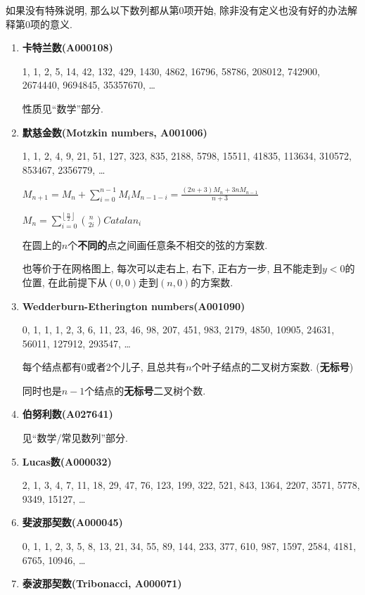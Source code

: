 如果没有特殊说明, 那么以下数列都从第$0$项开始, 除非没有定义也没有好的办法解释第$0$项的意义.

\begin{enumerate}

\item \textbf{卡特兰数(A000108)}

1, 1, 2, 5, 14, 42, 132, 429, 1430, 4862, 16796, 58786, 208012, 742900, 2674440, 9694845, 35357670, \dots

性质见``数学''部分.

\item \textbf{默慈金数(Motzkin numbers, A001006)}

1, 1, 2, 4, 9, 21, 51, 127, 323, 835, 2188, 5798, 15511, 41835, 113634, 310572, 853467, 2356779, \dots

$ M_{n + 1} = M_n + \sum_{i = 0} ^ {n - 1} M_i M_{n - 1 - i} = \frac {(2n + 3)M_n + 3n M_{n - 1}} {n + 3} $

$ M_n = \sum_{i = 0} ^ {\left\lfloor \frac n 2 \right\rfloor} {n \choose 2i} Catalan_{i} $

在圆上的$n$个\textbf{不同的}点之间画任意条不相交的弦的方案数.

也等价于在网格图上, 每次可以走右上, 右下, 正右方一步, 且不能走到$y<0$的位置, 在此前提下从$(0, 0)$走到$(n, 0)$的方案数.


\item \textbf{Wedderburn-Etherington numbers(A001090)}

0, 1, 1, 1, 2, 3, 6, 11, 23, 46, 98, 207, 451, 983, 2179, 4850, 10905, 24631, 56011, 127912, 293547, \dots

每个结点都有$0$或者$2$个儿子, 且总共有$n$个叶子结点的二叉树方案数. (\textbf{无标号})

同时也是$n-1$个结点的\textbf{无标号}二叉树个数.

\item \textbf{伯努利数(A027641)}

见``数学/常见数列''部分.

\item \textbf{Lucas数(A000032)}

2, 1, 3, 4, 7, 11, 18, 29, 47, 76, 123, 199, 322, 521, 843, 1364, 2207, 3571, 5778, 9349, 15127, \dots

\item \textbf{斐波那契数(A000045)}

0, 1, 1, 2, 3, 5, 8, 13, 21, 34, 55, 89, 144, 233, 377, 610, 987, 1597, 2584, 4181, 6765, 10946, \dots

\item \textbf{泰波那契数(Tribonacci, A000071)}


\end{enumerate}
